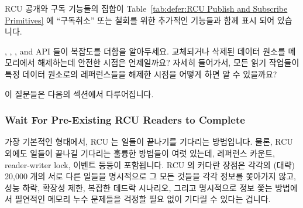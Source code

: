 RCU 공개와 구독 기능들의 집합이
Table~\ref{tab:defer:RCU Publish and Subscribe Primitives} 에 ``구독취소'' 또는
철회를 위한 추가적인 기능들과 함께 표시 되어 있습니다.

, ,
, and 
API 들이 복잡도를 더함을 알아두세요.
교체되거나 삭제된 데이터 원소를 메모리에서 해제하는데 안전한 시점은 언제일까요?
자세히 들어가서, 모든 읽기 작업들이 특정 데이터 원소로의 레퍼런스들을
해제한 시점을 어떻게 하면 알 수 있을까요?

이 질문들은 다음의 섹션에서 다루어집니다.

\subsubsection{Wait For Pre-Existing RCU Readers to Complete}
\label{sec:defer:Wait For Pre-Existing RCU Readers to Complete}

가장 기본적인 형태에서, RCU 는 일들이 끝나기를 기다리는 방법입니다.
물론, RCU 외에도 일들이 끝나길 기다리는 훌륭한 방법들이 여럿 있는데, 레퍼런스
카운트, reader-writer lock, 이벤트 등등이 포함됩니다.
RCU 의 커다란 장점은 각각의 (대략) 20,000 개의 서로 다른 일들을 명시적으로 그
모든 것들을 각각 정보를 쫓아가지 않고, 성능 하락, 확장성 제한, 복잡한 데드락
시나리오, 그리고 명시적으로 정보 쫓는 방법에서 필연적인 메모리 누수 문제들을
걱정할 필요 없이 기다릴 수 있다는 겁니다.

